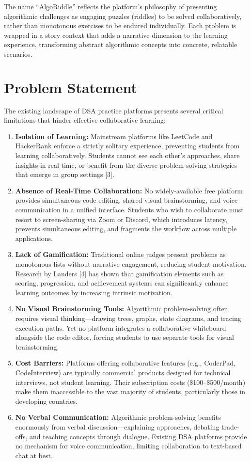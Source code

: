 The name ``AlgoRiddle'' reflects the platform's philosophy of presenting algorithmic challenges as engaging puzzles (riddles) to be solved collaboratively, rather than monotonous exercises to be endured individually. Each problem is wrapped in a story context that adds a narrative dimension to the learning experience, transforming abstract algorithmic concepts into concrete, relatable scenarios.

\section{Problem Statement}

The existing landscape of DSA practice platforms presents several critical limitations that hinder effective collaborative learning:

\begin{enumerate}[label=\arabic*.]
    \item \textbf{Isolation of Learning:} Mainstream platforms like LeetCode and HackerRank enforce a strictly solitary experience, preventing students from learning collaboratively. Students cannot see each other's approaches, share insights in real-time, or benefit from the diverse problem-solving strategies that emerge in group settings [3].
    \item \textbf{Absence of Real-Time Collaboration:} No widely-available free platform provides simultaneous code editing, shared visual brainstorming, and voice communication in a unified interface. Students who wish to collaborate must resort to screen-sharing via Zoom or Discord, which introduces latency, prevents simultaneous editing, and fragments the workflow across multiple applications.
    \item \textbf{Lack of Gamification:} Traditional online judges present problems as monotonous lists without narrative engagement, reducing student motivation. Research by Landers [4] has shown that gamification elements such as scoring, progression, and achievement systems can significantly enhance learning outcomes by increasing intrinsic motivation.
    \item \textbf{No Visual Brainstorming Tools:} Algorithmic problem-solving often requires visual thinking---drawing trees, graphs, state diagrams, and tracing execution paths. Yet no platform integrates a collaborative whiteboard alongside the code editor, forcing students to use separate tools for visual brainstorming.
    \item \textbf{Cost Barriers:} Platforms offering collaborative features (e.g., CoderPad, CodeInterview) are typically commercial products designed for technical interviews, not student learning. Their subscription costs (\$100--\$500/month) make them inaccessible to the vast majority of students, particularly those in developing countries.
    \item \textbf{No Verbal Communication:} Algorithmic problem-solving benefits enormously from verbal discussion---explaining approaches, debating trade-offs, and teaching concepts through dialogue. Existing DSA platforms provide no mechanism for voice communication, limiting collaboration to text-based chat at best.
\end{enumerate}

